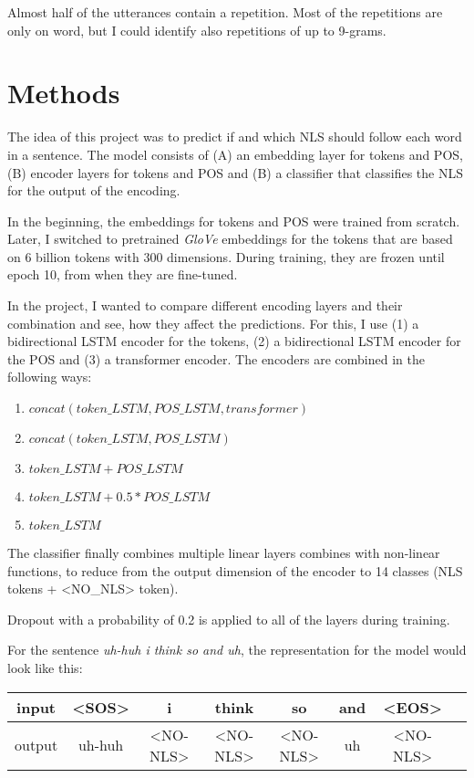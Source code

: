 \documentclass[
	11pt, %
]{fphw}
\begin{document}
Almost half of the utterances contain a repetition. Most of the repetitions are only on word, but I could identify also repetitions of up to 9-grams.

\section*{Methods}
The idea of this project was to predict if and which NLS should follow each word in a sentence. The model consists of (A) an embedding layer for tokens and POS, (B) encoder layers for tokens and POS and (B) a classifier that classifies the NLS for the output of the encoding.

In the beginning, the embeddings for tokens and POS were trained from scratch. Later, I switched to pretrained \emph{GloVe} embeddings for the tokens that are based on 6 billion tokens with 300 dimensions. During training, they are frozen until epoch 10, from when they are fine-tuned.

In the project, I wanted to compare different encoding layers and their combination and see, how they affect the predictions. For this, I use (1) a bidirectional LSTM encoder for the tokens, (2) a bidirectional LSTM encoder for the POS and (3) a transformer encoder. The encoders are combined in the following ways:
\begin{enumerate}
    \item $concat(token\_LSTM, POS\_LSTM, transformer)$
    \item $concat(token\_LSTM, POS\_LSTM)$
    \item $token\_LSTM + POS\_LSTM$
    \item $token\_LSTM + 0.5 * POS\_LSTM$
    \item $token\_LSTM$
\end{enumerate} 

The classifier finally combines multiple linear layers combines with non-linear functions, to reduce from the output dimension of the encoder to 14 classes (NLS tokens + <NO\_NLS> token).

Dropout with a probability of 0.2 is applied to all of the layers during training.

For the sentence \emph{uh-huh i think so and uh}, the representation for the model would look like this:

\begin{table}[h]
    \centering
    \begin{tabular}{c || c c c c c c c}
        input  & <SOS>  & i        & think    & so       & and & <EOS>    \\
        \hline
        output & uh-huh & <NO-NLS> & <NO-NLS> & <NO-NLS> & uh  & <NO-NLS>
    \end{tabular}
\end{table}
\end{document}
